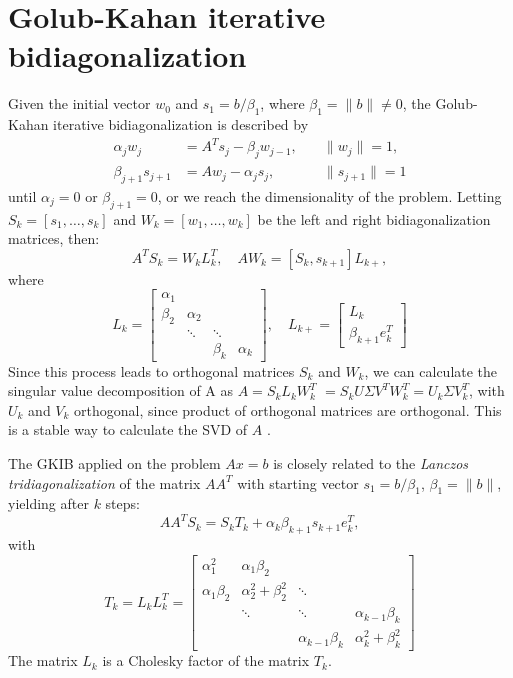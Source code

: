\documentclass[11pt]{amsart}
\begin{document}
\section{Golub-Kahan iterative bidiagonalization}
Given the initial vector $w_{0}$ and $s_{1} = b/\beta_{1}$, where 
$\beta_{1} = \|b\| \neq 0$, the Golub-Kahan iterative bidiagonalization is
described by
\begin{align*}
  \alpha_{j}w_{j} &= A^{T}s_{j} - \beta_{j}w_{j-1}, &\quad \|w_{j}\|=1,\\
  \beta_{j+1}s_{j+1} &= Aw_{j} - \alpha_{j}s_{j}, &\quad \|s_{j+1}\|=1
\end{align*}
until $\alpha_{j} = 0$ or $\beta_{j+1} = 0$, or we reach the dimensionality of
the problem. Letting $S_{k} = [s_{1},\ldots,s_{k}]$ and 
$W_{k}= [w_{1},\ldots,w_{k}]$ be the left and right bidiagonalization matrices,
then:
\begin{equation*}
  A^{T}S_{k} = W_{k}L_{k}^{T}, \quad AW_{k} = [S_{k},s_{k+1}]L_{k+},
\end{equation*}
where
\begin{equation*}
  L_{k} =
  \begin{bmatrix}
    \alpha_{1} & & & \\
    \beta_{2} & \alpha_{2} & & \\
    & \ddots & \ddots & \\
    & & \beta_{k} & \alpha_{k}
  \end{bmatrix}, \quad
  L_{k+} = 
  \begin{bmatrix}
    L_{k} \\
    \beta_{k+1}e_{k}^{T}
  \end{bmatrix}
\end{equation*}
Since this process leads to orthogonal matrices $S_{k}$ and $W_{k}$, we can
calculate the singular value decomposition of A as $A = S_{k}L_{k}W_{k}^{T}$
$= S_{k}U\Sigma V^{T}W_{k}^{T} = U_{k}\Sigma V_{k}^{T}$, with $U_{k}$ and 
$V_{k}$ orthogonal, since product of orthogonal matrices are orthogonal. This is
a stable way to calculate the SVD of $A$ \cite{svdRef}.

The GKIB applied on the problem $Ax = b$ is closely related to the
\emph{Lanczos tridiagonalization} of the matrix $AA^{T}$ with starting vector
$s_{1} = b/\beta_{1}$, $\beta_{1} = \|b\|$, yielding after $k$ steps:
\begin{equation} \label{eq:tridiag}
  AA^{T}S_{k} = S_{k}T_{k} + \alpha_{k}\beta_{k+1}s_{k+1}e_{k}^{T},
\end{equation}
with
\begin{equation*}
  T_{k} = L_{k}L_{k}^{T} = 
  \begin{bmatrix}
    \alpha_{1}^{2} & \alpha_{1}\beta_{2} & & \\
    \alpha_{1}\beta_{2} & \alpha_{2}^{2} + \beta_{2}^{2} & \ddots & \\
    & \ddots & \ddots & \alpha_{k-1}\beta_{k} \\
    & & \alpha_{k-1}\beta_{k} & \alpha_{k}^{2} + \beta_{k}^{2}
  \end{bmatrix}
\end{equation*}
The matrix $L_{k}$ is a Cholesky factor of the matrix $T_{k}$.
\end{document}
